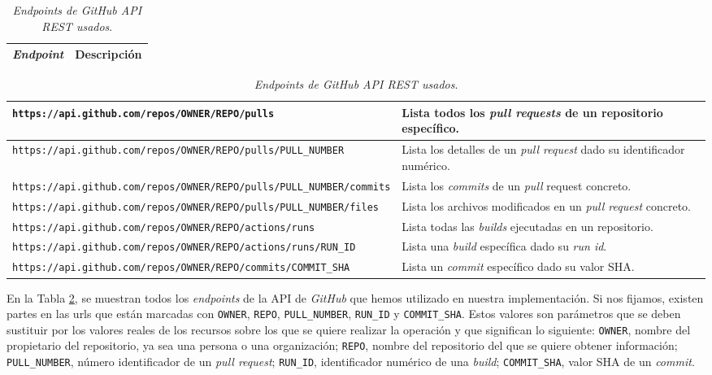 \begin{table}[H]
    \centering
    \caption{\textit{\textit{\textit{Endpoints} de GitHub API REST usados}}.}
    \label{tab:API_endpoints}

    \begin{tabular}{|>{\centering\arraybackslash}m{11cm}|>{\centering\arraybackslash}m{5cm}|} %
        \hline
        \textbf{\textit{Endpoint}} & \textbf{Descripción} \\
        \hline
    \end{tabular}
    \begin{tabular}{|>{\raggedright\arraybackslash}m{11cm}|>{\raggedright\arraybackslash}m{5cm}|} %
        \hline
        \texttt{https://api.github.com/repos/OWNER/REPO/pulls} & Lista todos los \textit{pull requests} de un repositorio específico.\\
        \hline
        \texttt{https://api.github.com/repos/OWNER/REPO/pulls/PULL\_NUMBER} & Lista los detalles de un \textit{pull request} dado su identificador numérico.\\
        \hline
        \texttt{https://api.github.com/repos/OWNER/REPO/pulls/PULL\_NUMBER/commits} & Lista los \textit{commits} de un \textit{pull} request concreto.\\
        \hline
        \texttt{https://api.github.com/repos/OWNER/REPO/pulls/PULL\_NUMBER/files} & Lista los archivos modificados en un \textit{pull request} concreto.\\
        \hline         
        \texttt{https://api.github.com/repos/OWNER/REPO/actions/runs} & Lista todas las \textit{builds} ejecutadas en un repositorio.\\
        \hline
        \texttt{https://api.github.com/repos/OWNER/REPO/actions/runs/RUN\_ID} & Lista una \textit{build} específica dado su \textit{run id}.\\
        \hline
        \texttt{https://api.github.com/repos/OWNER/REPO/commits/COMMIT\_SHA} & Lista un \textit{commit} específico dado su valor SHA. \\
        \hline
    \end{tabular}
\end{table}

En la Tabla \ref{tab:API_endpoints}, se muestran todos los \textit{endpoints} de la API de
\textit{GitHub} que hemos utilizado en nuestra implementación. Si nos fijamos, existen partes
en las urls que están marcadas con \texttt{OWNER}, \texttt{REPO}, \texttt{PULL\_NUMBER},
\texttt{RUN\_ID} y \texttt{COMMIT\_SHA}. Estos valores son parámetros que se deben sustituir por
los valores reales de los recursos sobre los que se quiere realizar la operación y que significan
lo siguiente: \texttt{OWNER}, nombre del propietario del repositorio, ya sea una persona o una
organización; \texttt{REPO}, nombre del repositorio del que se quiere obtener información;
\texttt{PULL\_NUMBER}, número identificador de un \textit{pull request}; \texttt{RUN\_ID},
identificador numérico de una \textit{build}; \texttt{COMMIT\_SHA}, valor SHA de un
\textit{commit}.\\


